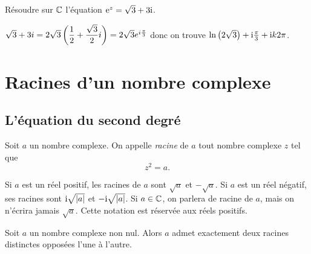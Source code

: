 \documentclass{magnoliaold}
\begin{document}
\begin{exoUnique}
\exo Résoudre sur $\mathbb{C}$ l'équation ${\rm e}^z=\sqrt{3}+3{\rm i}$.
  \begin{sol}
  $\sqrt{3}+3i=2\sqrt{3}\left(\dfrac{1}{2}+\dfrac{\sqrt 3}{2}i\right)=2\sqrt{3}e^{i\frac{\pi}{3}}$ donc on trouve $\ln\left(2\sqrt{3}\right)+{\rm i}\frac{\pi}{3}+{\rm i} k2\pi$.
  \end{sol}
\end{exoUnique}

\section{Racines d'un nombre complexe}
\subsection{L'équation du second degré}

\begin{definition}[utile=-3]
Soit $a$ un nombre complexe. On appelle \emph{racine} de $a$ tout nombre complexe $z$
tel que
\[z^2=a.\]
\end{definition}

\begin{remarques}
\remarque Si $a$ est un réel positif, les racines de $a$ sont $\sqrt{a}$ et $-\sqrt{a}$.
  Si $a$ est un réel négatif, ses racines sont ${\rm i}\sqrt{\left|a\right|}$ et
  $-{\rm i}\sqrt{\left|a\right|}$.
\remarque Si $a\in\mathbb{C}$, on parlera de racine de $a$, mais on n'écrira jamais $\sqrt{a}$. Cette notation est réservée aux réels positifs.
\end{remarques}

\begin{proposition}[utile=-3]
Soit $a$ un nombre complexe non nul. Alors $a$ admet exactement deux
racines distinctes opposées l'une à l'autre.
\end{proposition}
\end{document}
